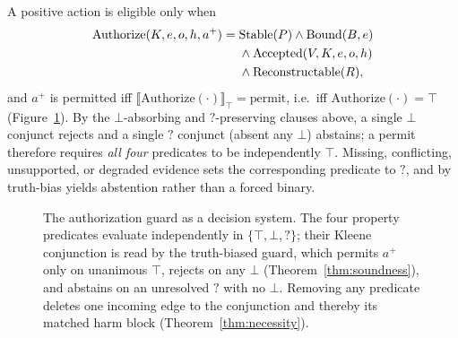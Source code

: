 \documentclass[sigconf,anonymous,review]{acmart}
\begin{document}
A positive action is eligible only when
\begin{align}
\mathrm{Authorize}(K,e,o,h,a^+)={}&\mathrm{Stable}(P)\land\mathrm{Bound}(B,e)\notag\\
&\land\mathrm{Accepted}(V,K,e,o,h)\notag\\
&\land\mathrm{Reconstructable}(R),
\end{align}
and $a^+$ is permitted iff $\llbracket\mathrm{Authorize}(\cdot)\rrbracket_\top=\text{permit}$, i.e.\ iff $\mathrm{Authorize}(\cdot)=\top$ (Figure~\ref{fig:guard}). By the $\bot$-absorbing and $?$-preserving clauses above, a single $\bot$ conjunct rejects and a single $?$ conjunct (absent any $\bot$) abstains; a permit therefore requires \emph{all four} predicates to be independently $\top$. Missing, conflicting, unsupported, or degraded evidence sets the corresponding predicate to $?$, and by truth-bias yields abstention rather than a forced binary.

\begin{figure}[t]
\centering
{}
\caption{The authorization guard as a decision system. The four property predicates evaluate independently in $\{\top,\bot,?\}$; their Kleene conjunction is read by the truth-biased guard, which permits $a^+$ only on unanimous $\top$, rejects on any $\bot$ (Theorem~\ref{thm:soundness}), and abstains on an unresolved $?$ with no $\bot$. Removing any predicate deletes one incoming edge to the conjunction and thereby its matched harm block (Theorem~\ref{thm:necessity}).}
\label{fig:guard}
\end{figure}
\end{document}
